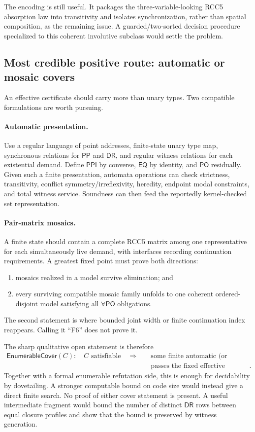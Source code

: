 \documentclass[11pt]{article}
\newcommand{\PO}{\ensuremath{\mathsf{PO}}}
\newcommand{\PP}{\ensuremath{\mathsf{PP}}}
\newcommand{\PPI}{\ensuremath{\mathsf{PPI}}}
\newcommand{\DR}{\ensuremath{\mathsf{DR}}}
\newcommand{\EQ}{\ensuremath{\mathsf{EQ}}}
\begin{document}
The encoding is still useful.  It packages the three-variable-looking RCC5
absorption law into transitivity and isolates synchronization, rather than
spatial composition, as the remaining issue.  A guarded/two-sorted decision
procedure specialized to this coherent involutive subclass would settle the
problem.

\subsection{Most credible positive route: automatic or mosaic covers}

An effective certificate should carry more than unary types.  Two compatible
formulations are worth pursuing.

\paragraph{Automatic presentation.}
Use a regular language of point addresses, finite-state unary type map,
synchronous relations for \PP{} and \DR{}, and regular witness relations for
each existential demand.  Define \PPI{} by converse, \EQ{} by identity, and
\PO{} residually.  Given such a finite presentation, automata operations can
check strictness, transitivity, conflict symmetry/irreflexivity, heredity,
endpoint modal constraints, and total witness service.  Soundness can then feed
the reportedly kernel-checked set representation.

\paragraph{Pair-matrix mosaics.}
A finite state should contain a complete RCC5 matrix among one representative
for each simultaneously live demand, with interfaces recording continuation
requirements.  A greatest fixed point must prove both directions:
\begin{enumerate}
  \item mosaics realized in a model survive elimination; and
  \item every surviving compatible mosaic family unfolds to one coherent
        ordered-disjoint model satisfying all \(\forall\PO\) obligations.
\end{enumerate}
The second statement is where bounded joint width or finite continuation index
reappears.  Calling it ``F6'' does not prove it.

The sharp qualitative open statement is therefore
\[
\begin{aligned}
\mathsf{EnumerableCover}(C):\quad
C\text{ satisfiable}\quad\Longrightarrow\quad
&\text{some finite automatic (or mosaic) code}\\[-2pt]
&\text{passes the fixed effective checker}.
\end{aligned}
\]
Together with a formal enumerable refutation side, this is enough for
decidability by dovetailing.  A stronger computable bound on code size would
instead give a direct finite search.  No proof of either cover statement is
present.  A useful intermediate fragment would
bound the number of distinct \DR{} rows between equal closure profiles and show
that the bound is preserved by witness generation.
\end{document}
